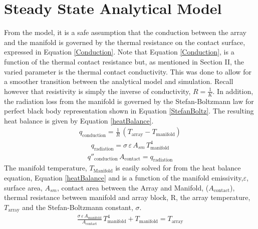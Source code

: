 \documentclass[journal]{new-aiaa}
\begin{document}
\section{Steady State Analytical Model}
From the model, it is a safe assumption that the conduction between the array and the manifold is governed by the thermal resistance on the contact surface, expressed in Equation \ref{Conduction}. Note that Equation \ref{Conduction}, is a function of the thermal contact resistance but, as mentioned in Section II, the varied parameter is the thermal contact conductivity. This was done to allow for a smoother transition between the analytical model and simulation. Recall however that resistivity is simply the inverse of conductivity, $R = \frac{1}{K}$. In addition, the radiation loss from the manifold is governed by the Stefan-Boltzmann law for perfect black body representation shown in Equation \ref{StefanBoltz}. The resulting heat balance is given by Equation \ref{heatBalance}.
\begin{equation}
\begin{aligned}
\label{Conduction}
q_{\text{conduction}} = \frac{1}{R} \, (T_{\text{array}} - T_{\text{manifold}})
\end{aligned}
\end{equation}
\begin{equation}
\begin{aligned}
\label{StefanBoltz}
q_{\text{radiation}} = \sigma \, \varepsilon \, A_{sm} \, T_{\text{manifold}}^4
\end{aligned}
\end{equation}
\begin{equation}
\begin{aligned}
\label{heatBalance}
q''_{\text{conduction}} \, A_{\text{contact}} = q_{\text{radiation}}
\end{aligned}
\end{equation}
The manifold temperature, $T_{\text{Manifold}}$ is easily solved for from the heat balance equation, Equation \ref{heatBalance} and is a function of the manifold emissivity,$\varepsilon$, surface area, $A_{sm}$, contact area between the Array and Manifold, ($A_{\text{contact}}$), thermal resistance between manifold and array block, R, the array temperature, $T_{\text{array}}$ and the Stefan-Boltzmann constant, $\sigma$. 
\begin{equation}
\begin{aligned}
\label{Balanced}
\frac{\sigma \, \varepsilon \, A_{\text{manifold}}}{A_{\text{contact}}}\,T_{\text{manifold}}^4 + T_{\text{manifold}} = T_{\text{array}}
\end{aligned}
\end{equation}
\end{document}

